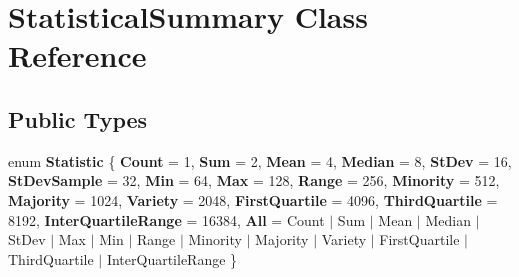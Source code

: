 \hypertarget{class_statistical_summary}{}\section{Statistical\+Summary Class Reference}
\label{class_statistical_summary}
\subsection*{Public Types}
\begin{DoxyCompactItemize}
\item 
\mbox{\label{class_statistical_summary_a697c6b65e71f9854eddb7ed401523149}} 
enum {\bfseries Statistic} \{ \newline
{\bfseries Count} = 1, 
{\bfseries Sum} = 2, 
{\bfseries Mean} = 4, 
{\bfseries Median} = 8, 
\newline
{\bfseries St\+Dev} = 16, 
{\bfseries St\+Dev\+Sample} = 32, 
{\bfseries Min} = 64, 
{\bfseries Max} = 128, 
\newline
{\bfseries Range} = 256, 
{\bfseries Minority} = 512, 
{\bfseries Majority} = 1024, 
{\bfseries Variety} = 2048, 
\newline
{\bfseries First\+Quartile} = 4096, 
{\bfseries Third\+Quartile} = 8192, 
{\bfseries Inter\+Quartile\+Range} = 16384, 
{\bfseries All} = Count $\vert$ Sum $\vert$ Mean $\vert$ Median $\vert$ St\+Dev $\vert$ Max $\vert$ Min $\vert$ Range $\vert$ Minority $\vert$ Majority $\vert$ Variety $\vert$ First\+Quartile $\vert$ Third\+Quartile $\vert$ Inter\+Quartile\+Range
 \}
\end{DoxyCompactItemize}

